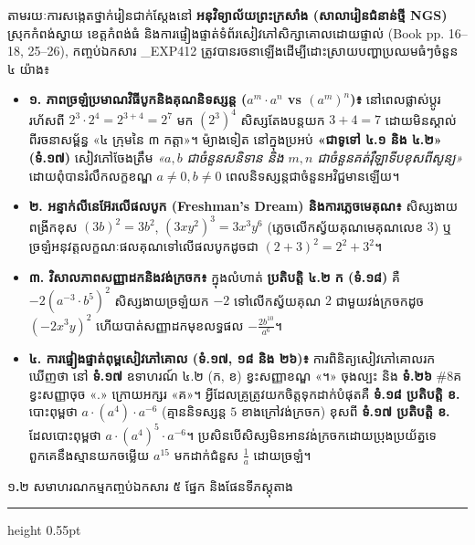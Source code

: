 \documentclass[a4paper,12pt]{article}
\newcommand{\en}[1]{{\TimesEn #1}}
\newcommand{\enbf}[1]{{\TimesEn\textbf{#1}}}
\newcommand{\subsectitle}[1]{{\muol\fontsize{11.5pt}{18.5pt}\selectfont #1}}
\newcommand{\subsec}[1]{%
  \Needspace{1.7cm}%
  \vspace{3pt}%
  \subsectitle{#1}\par%
  \vspace{-2pt}%
  {\color{black}\hrule height 0.55pt}%
  \vspace{3pt}%
}
\begin{document}
តាមរយៈការសង្កេតថ្នាក់រៀនជាក់ស្ដែងនៅ \textbf{អនុវិទ្យាល័យព្រះក្រសាំង (សាលារៀនជំនាន់ថ្មី \en{NGS})} ស្រុកកំពង់ស្វាយ ខេត្តកំពង់ធំ និងការផ្ទៀងផ្ទាត់ទំព័រសៀវភៅសិក្សាគោលដោយផ្ទាល់ (\en{Book pp. 16--18, 25--26}), កញ្ចប់ឯកសារ \en{\_EXP412} ត្រូវបានរចនាឡើងដើម្បីដោះស្រាយបញ្ហាប្រឈមធំៗចំនួន ៤ យ៉ាង៖
\begin{itemize}[leftmargin=0.65cm]
  \item \textbf{១. ភាពច្រឡំប្រមាណវិធីបូកនិងគុណនិទស្សន្ត ($a^m\cdot a^n$ vs $(a^m)^n$)៖} នៅពេលផ្លាស់ប្ដូររហ័សពី $2^3\cdot 2^4 = 2^{3+4} = 2^7$ មក $(2^3)^4$ សិស្សតែងបន្តយក $3+4=7$ ដោយមិនស្គាល់ពីរចនាសម្ព័ន្ធ «៤ ក្រុមនៃ ៣ កត្តា»។ ម៉្យាងទៀត នៅក្នុងប្រអប់ \textbf{«ជាទូទៅ ៤.១ និង ៤.២» (ទំ.១៧)} សៀវភៅចែងត្រឹម \textit{«$a, b$ ជាចំនួនសនិទាន និង $m, n$ ជាចំនួនគត់រ៉ឺឡាទីបខុសពីសូន្យ»} ដោយពុំបានរំលឹកលក្ខខណ្ឌ \textbf{$a\neq 0, b\neq 0$} ពេលនិទស្សន្តជាចំនួនអវិជ្ជមានឡើយ។
  \item \textbf{២. អន្ទាក់លីនេអ៊ែរលើផលបូក \en{(Freshman's Dream)} និងការភ្លេចមេគុណ៖} សិស្សងាយពង្រីកខុស $(3b)^2 = 3b^2$, $(3xy^2)^3 = 3x^3y^6$ (ភ្លេចលើកស្វ័យគុណមេគុណលេខ $3$) ឬច្រឡំអនុវត្តលក្ខណៈផលគុណទៅលើផលបូកដូចជា $(2+3)^2 = 2^2+3^2$។
  \item \textbf{៣. វិសាលភាពសញ្ញាដកនិងវង់ក្រចក៖} ក្នុងលំហាត់ \textbf{ប្រតិបត្តិ ៤.២ ក (ទំ.១៨)} គឺ $-2(a^{-3}\cdot b^5)^2$ សិស្សងាយច្រឡំយក $-2$ ទៅលើកស្វ័យគុណ $2$ ជាមួយវង់ក្រចកដូច $(-2x^3y)^2$ ហើយបាត់សញ្ញាដកមុខលទ្ធផល $-\frac{2b^{10}}{a^6}$។
  \item \textbf{៤. ការផ្ទៀងផ្ទាត់ពុម្ពសៀវភៅគោល (ទំ.១៧, ១៨ និង ២៦)៖} ការពិនិត្យសៀវភៅគោលរកឃើញថា នៅ \textbf{ទំ.១៧} ឧទាហរណ៍ ៤.២ (ក, ខ) ខ្វះសញ្ញាខណ្ឌ «។» ចុងល្បះ និង \textbf{ទំ.២៦} \en{\#8}គ ខ្វះសញ្ញាចុច «.» ក្រោយអក្សរ «គ»។ អ្វីដែលគ្រូត្រូវយកចិត្តទុកដាក់បំផុតគឺ \textbf{ទំ.១៨ ប្រតិបត្តិ ខ.} បោះពុម្ពថា \textbf{$a \cdot (a^4) \cdot a^{-6}$} (គ្មាននិទស្សន្ត $5$ ខាងក្រៅវង់ក្រចក) ខុសពី \textbf{ទំ.១៧ ប្រតិបត្តិ ខ.} ដែលបោះពុម្ពថា \textbf{$a \cdot (a^4)^5 \cdot a^{-6}$}។ ប្រសិនបើសិស្សមិនអានវង់ក្រចកដោយប្រុងប្រយ័ត្នទេ ពួកគេនឹងស្មានយកចម្លើយ $a^{15}$ មកដាក់ជំនួស $\frac{1}{a}$ ដោយច្រឡំ។
\end{itemize}

\subsec{១\enbf{.}២ សមាហរណកម្មកញ្ចប់ឯកសារ ៥ ផ្នែក និងផែនទីភស្តុតាង}
\end{document}
